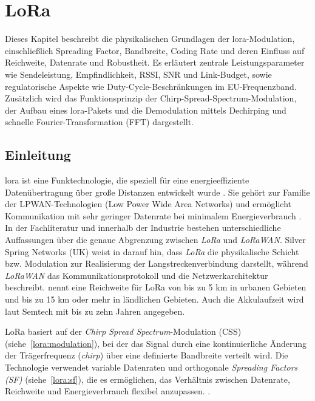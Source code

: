 %
%

\chapter{LoRa \label{lora:general}}
	Dieses Kapitel beschreibt die physikalischen Grundlagen der \acf{lora}-Modulation, einschlie{\ss}lich Spreading Factor, Bandbreite, Coding Rate und deren Einfluss auf Reichweite, Datenrate und Robustheit. Es erläutert zentrale Leistungsparameter wie Sendeleistung, Empfindlichkeit, RSSI, SNR und Link-Budget, sowie regulatorische Aspekte wie Duty-Cycle-Beschränkungen im EU-Frequenzband. Zusätzlich wird das Funktionsprinzip der Chirp-Spread-Spectrum-Modulation, der Aufbau eines \acs{lora}-Pakets und die Demodulation mittels Dechirping und schnelle Fourier-Transformation (FFT) dargestellt.
	
\section{Einleitung}
	\acf{lora} ist eine Funktechnologie, die speziell für eine energieeffiziente Datenübertragung über gro{\ss}e Distanzen entwickelt wurde \cite{Semtech:2015}. Sie gehört zur Familie der LPWAN-Technologien (Low Power Wide Area Networks) und ermöglicht Kommunikation mit sehr geringer Datenrate bei minimalem Energieverbrauch \cite{Semtech:2024}.	
	In der Fachliteratur und innerhalb der Industrie bestehen unterschiedliche Auffassungen über die genaue Abgrenzung zwischen \textit{LoRa\texttrademark} und \textit{LoRaWAN\texttrademark}. Silver Spring Networks (UK) weist in \textcite{ETSI:2018} darauf hin, dass \textit{LoRa} die physikalische Schicht bzw. Modulation zur Realisierung der Langstreckenverbindung darstellt, während \textit{LoRaWAN} das Kommunikationsprotokoll und die Netzwerkarchitektur beschreibt.\textcite{Semtech:2024} nennt eine Reichweite für LoRa von bis zu 5 km in urbanen Gebieten und bis zu 15 km oder mehr in ländlichen Gebieten. Auch die Akkulaufzeit wird laut Semtech mit bis zu zehn Jahren angegeben.
	
	\vspace{0.5cm}
	LoRa basiert auf der \textit{Chirp Spread Spectrum}-Modulation (CSS) (siehe~\ref{lora:modulation}), bei der das Signal durch eine kontinuierliche Änderung der Trägerfrequenz (\textit{chirp}) über eine definierte Bandbreite verteilt wird. Die Technologie verwendet variable Datenraten und orthogonale \textit{Spreading Factors (SF)} (siehe~\ref{lora:sf}), die es ermöglichen, das Verhältnis zwischen Datenrate, Reichweite und Energieverbrauch flexibel anzupassen. \cite{Semtech:2015}.


